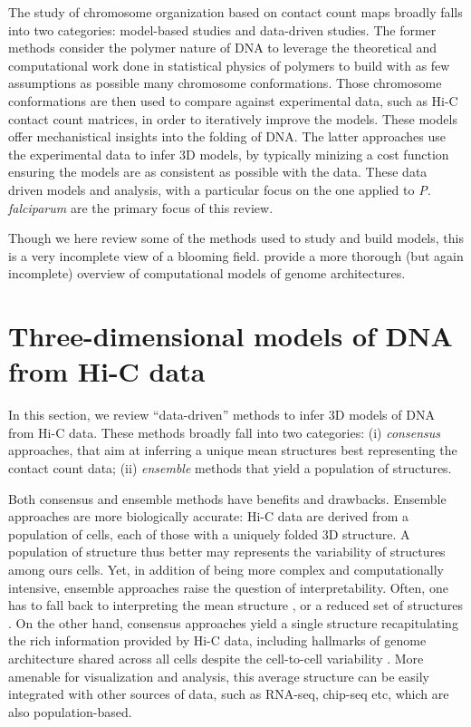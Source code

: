 \documentclass[letterpaper,12pt]{article}
\begin{document}
The study of chromosome organization based on contact count maps broadly
falls into two categories: model-based studies and data-driven studies. The
former methods consider the polymer nature of DNA to leverage the theoretical
and computational work done in statistical physics of polymers to build with
as few assumptions as possible many chromosome conformations. Those chromosome
conformations are then used to compare against experimental data, such as Hi-C
contact count matrices, in order to iteratively improve the models. These
models offer mechanistical insights into the folding of DNA. The latter
approaches use the experimental data to infer 3D models, by typically minizing
a cost function ensuring the models are as consistent as possible with the
data. These data driven models and analysis, with a particular focus on the
one applied to {\em P. falciparum} are the primary focus of this
review.


Though we here review some of the methods used to study and build models, this
is a very incomplete view of a blooming field. \citet{rosa:computational}
provide a more thorough (but again incomplete) overview of computational models
of genome architectures.


\section*{Three-dimensional models of DNA from Hi-C data}

In this section, we review ``data-driven'' methods to infer 3D models of DNA
from Hi-C data. These methods broadly fall into two categories: (i)
\textit{consensus} approaches, that aim at inferring a unique mean structures
best representing the contact count data; (ii) \textit{ensemble} methods that
yield a population of structures.

Both consensus and ensemble methods have benefits and drawbacks. Ensemble
approaches are more biologically accurate: Hi-C data are derived from a
population of cells, each of those with a uniquely folded 3D structure. A
population of structure thus better may represents the variability of
structures among ours cells. Yet, in addition of being more complex and
computationally intensive, ensemble approaches raise the question of
interpretability. Often, one has to fall back to interpreting the mean
structure \citep{kalhor:genome}, or a reduced set of structures
\citep{rousseau:three}. On the other hand, consensus approaches yield a single
structure recapitulating the rich information provided by Hi-C data, including
hallmarks of genome architecture shared across all cells despite the
cell-to-cell variability \citet{nagano:single-cell}. More amenable for
visualization and analysis, this average structure can be easily integrated
with other sources of data, such as RNA-seq, chip-seq etc, which are also
population-based.
\end{document}
